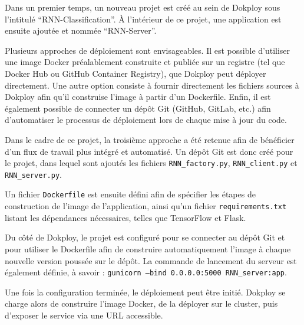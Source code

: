 \documentclass{report} %
\begin{document}
Dans un premier temps, un nouveau projet est créé au sein de Dokploy sous l'intitulé ``RNN-Classification''. 
À l'intérieur de ce projet, une application est ensuite ajoutée et nommée ``RNN-Server''.

Plusieurs approches de déploiement sont envisageables. Il est possible d’utiliser une image Docker préalablement construite 
et publiée sur un registre (tel que Docker Hub ou GitHub Container Registry), que Dokploy peut déployer directement. 
Une autre option consiste à fournir directement les fichiers sources à Dokploy afin qu’il construise l’image à partir d’un Dockerfile. 
Enfin, il est également possible de connecter un dépôt Git (GitHub, GitLab, etc.) afin d’automatiser le processus 
de déploiement lors de chaque mise à jour du code.

Dans le cadre de ce projet, la troisième approche a été retenue afin de bénéficier d’un flux de travail plus intégré et automatisé. 
Un dépôt Git est donc créé pour le projet, dans lequel sont ajoutés les fichiers \texttt{RNN\_factory.py}, \texttt{RNN\_client.py} et 
\texttt{RNN\_server.py}.

Un fichier \texttt{Dockerfile} est ensuite défini afin de spécifier les étapes de construction de l’image de l’application, 
ainsi qu’un fichier \texttt{requirements.txt} listant les dépendances nécessaires, telles que TensorFlow et Flask.

Du côté de Dokploy, le projet est configuré pour se connecter au dépôt Git et pour utiliser le Dockerfile afin de construire 
automatiquement l’image à chaque nouvelle version poussée sur le dépôt. La commande de lancement du serveur est également définie, 
à savoir : \texttt{gunicorn --bind 0.0.0.0:5000 RNN\_server:app}.

Une fois la configuration terminée, le déploiement peut être initié. Dokploy se charge alors de construire l’image Docker, 
de la déployer sur le cluster, puis d’exposer le service via une URL accessible.
\end{document}
